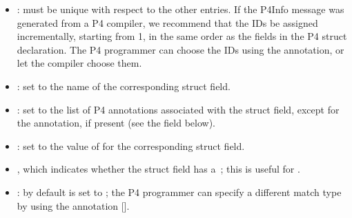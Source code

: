 \documentclass[11pt]{article}
\begin{document}
{\begin{enumerate}[,start=2]
\begin{itemize}[noitemsep,topsep=\mdcompacttopsep]%

\item{}: must be unique with respect to the other  entries. If the P4Info
message was generated from a P4 compiler, we recommend that the IDs be
assigned incrementally, starting from 1, in the same order as the fields in
the P4 struct declaration. The P4 programmer can choose the IDs using the
 annotation, or let the compiler choose them.%

\item{}: set to the name of the corresponding struct field.%

\item{}: set to the list of P4 annotations associated with the struct
field, except for the  annotation, if present (see the  field
below).%

\item{}: set to the value of  for the corresponding struct field.%

\item{}, which indicates whether the struct field has a~; this is useful for
.%

\item{}: by default  is set to ; the P4 programmer can
specify a different match type by using the  annotation
[].%


\end{itemize}
\end{enumerate}}
\end{document}
